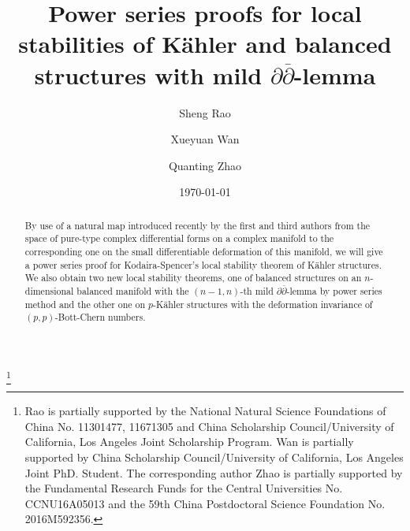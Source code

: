 \documentclass[12pt]{amsart}
\numberwithin{equation}{section}
\renewcommand{\1}{\mathds{1}}
\newcommand{\db}{\overline{\partial}}
\renewcommand{\>}{\rightarrow}
\newcommand{\p}{\partial}
\def\p{\partial}
\begin{document}
\title{Power series proofs for local stabilities of K\"{a}hler and balanced structures with mild $\p\db$-lemma}

\begin{abstract}
By use of a natural map introduced recently by the first and third
authors from the space of pure-type complex differential forms on a
complex manifold to the corresponding one on the small differentiable
deformation of this manifold, we will give a power series proof for
Kodaira-Spencer's local stability theorem of K\"{a}hler structures.
We also obtain two new local stability theorems, one of balanced
structures on an $n$-dimensional balanced manifold with the
$(n-1,n)$-th mild $\p\db$-lemma by power series method and the other one on $p$-K\"{a}hler structures with the deformation invariance of $(p,p)$-Bott-Chern numbers.
\end{abstract}

\author{Sheng Rao}
\address{School of Mathematics and statistics, Wuhan  University,
Wuhan 430072, China; Department of Mathematics, University of
California at Los Angeles, CA 90095-1555, USA}
\thanks{Rao is partially supported by the National Natural Science Foundations of China No. 11301477, 11671305
and China Scholarship Council/University of California, Los Angeles Joint Scholarship
Program. Wan is partially supported by China Scholarship Council/University of California, Los Angeles Joint PhD. Student.
 The corresponding author Zhao is partially supported by the
Fundamental Research Funds for the Central Universities No.
CCNU16A05013 and the 59th China Postdoctoral Science
Foundation No. 2016M592356.}


\author{Xueyuan Wan}
\address{Chern Institute of Mathematics \& LPMC, Nankai
University, Tianjin 300071, China.}


\author{Quanting Zhao}
\address{School of Mathematics and Statistics \&
Hubei Key Laboratory of Mathematical Sciences, Central China Normal
University, Wuhan, 430079, P.R.China.} 

\date{\today}


\maketitle
\end{document}
